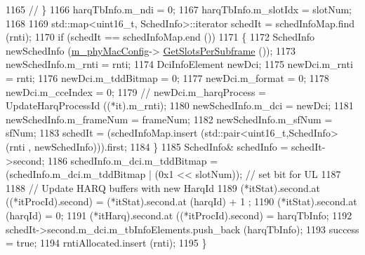 \begin{DoxyCode}
1165 \textcolor{comment}{//                              \}}
1166                                 harqTbInfo.m\_ndi = 0;
1167                                 harqTbInfo.m\_slotIdx = slotNum;
1168 
1169                                 std::map<uint16\_t, SchedInfo>::iterator schedIt = schedInfoMap.find (rnti);
1170                                 \textcolor{keywordflow}{if} (schedIt == schedInfoMap.end ())
1171                                 \{
1172                                         SchedInfo newSchedInfo (\hyperlink{classns3_1_1MmWaveMacScheduler_a24d7af4971d2e500fe543cefbafa2fd9}{m\_phyMacConfig}->
      \hyperlink{classns3_1_1MmWavePhyMacCommon_a7b6552d2e0ffbeaf3bc2f9db6d0d6e63}{GetSlotsPerSubframe} ());
1173                                         newSchedInfo.m\_rnti = rnti;
1174                                         DciInfoElement newDci;
1175                                         newDci.m\_rnti = rnti;
1176                                         newDci.m\_tddBitmap = 0;
1177                                         newDci.m\_format = 0;
1178                                         newDci.m\_cceIndex = 0;
1179                                         \textcolor{comment}{//                              newDci.m\_harqProcess =
       UpdateHarqProcessId ((*it).m\_rnti);}
1180                                         newSchedInfo.m\_dci = newDci;
1181                                         newSchedInfo.m\_frameNum = frameNum;
1182                                         newSchedInfo.m\_sfNum = sfNum;
1183                                         schedIt = (schedInfoMap.insert (std::pair<uint16\_t,SchedInfo> (rnti
      , newSchedInfo))).first;
1184                                 \}
1185                                 SchedInfo& schedInfo = schedIt->second;
1186                                 schedInfo.m\_dci.m\_tddBitmap = (schedInfo.m\_dci.m\_tddBitmap | (0x1 << 
      slotNum)); \textcolor{comment}{// set bit for UL}
1187 
1188                                 \textcolor{comment}{// Update HARQ buffers with new HarqId}
1189                                 (*itStat).second.at ((*itProcId).second) = (*itStat).second.at (harqId) + 1
      ;
1190                                 (*itStat).second.at (harqId) = 0;
1191                                 (*itHarq).second.at ((*itProcId).second) = harqTbInfo;
1192                                 schedIt->second.m\_dci.m\_tbInfoElements.push\_back (harqTbInfo);
1193                                 success = \textcolor{keyword}{true};
1194                                 rntiAllocated.insert (rnti);
1195                         \}

\end{DoxyCode}
